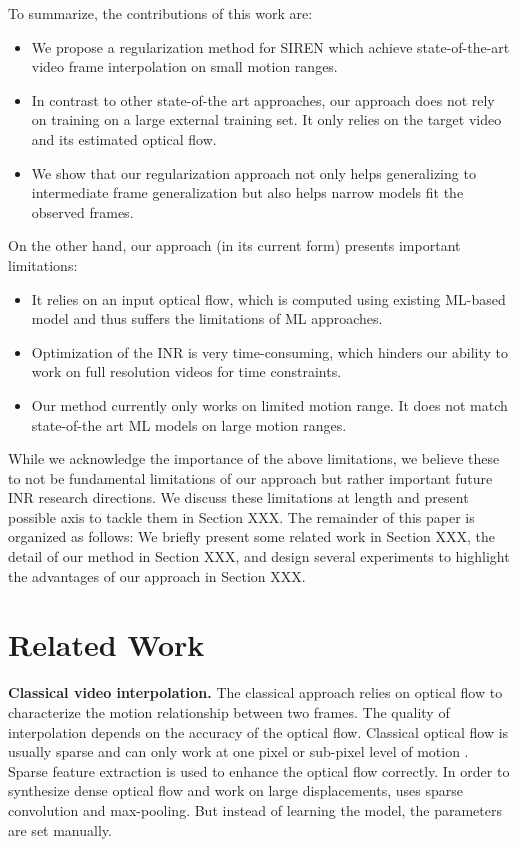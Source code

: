 \documentclass{article}
\begin{document}
To summarize, the contributions of this work are:
\begin{itemize}
\item We propose a regularization method for SIREN which achieve state-of-the-art video frame interpolation on small motion ranges.
\item In contrast to other state-of-the art approaches, our approach does not rely on training on a large external training set.
It only relies on the target video and its estimated optical flow.
\item We show that our regularization approach not only helps generalizing to intermediate frame generalization
but also helps narrow models fit the observed frames.
\end{itemize}

On the other hand, our approach (in its current form) presents important limitations:

\begin{itemize}
\item It relies on an input optical flow, which is computed using existing ML-based model and thus suffers the limitations of ML approaches.
\item Optimization of the INR is very time-consuming, which hinders our ability to work on full resolution videos for time constraints.
\item Our method currently only works on limited motion range. It does not match state-of-the art ML models on large motion ranges.
\end{itemize}

While we acknowledge the importance of the above limitations,
we believe these to not be fundamental limitations of our approach but rather important future INR research directions.
We discuss these limitations at length and present possible axis to tackle them in Section XXX.
The remainder of this paper is organized as follows:
We briefly present some related work in Section XXX, the detail of our method in Section XXX,
and design several experiments to highlight the advantages of our approach in Section XXX.

\section{Related Work}
\textbf{Classical video interpolation.}
The classical approach relies on optical flow to characterize the motion relationship between two frames.
The quality of interpolation depends on the accuracy of the optical flow.
Classical optical flow is usually sparse and can only work at one pixel or sub-pixel level of motion \cite{chen2012real}.
Sparse feature extraction \cite{liu2008sift} is used to enhance the optical flow correctly.
In order to synthesize dense optical flow and work on large displacements, \cite{weinzaepfel2013deepflow} uses sparse convolution and max-pooling.
But instead of learning the model, the parameters are set manually.
\end{document}
